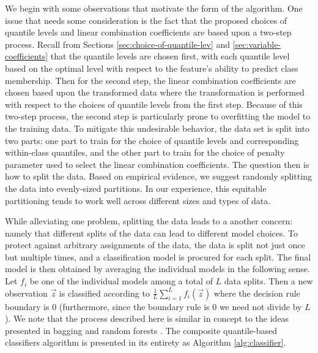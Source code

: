 We begin with some observations that motivate the form of the algorithm.  One
issue that needs some consideration is the fact that the proposed choices of
quantile levels and linear combination coefficients are based upon a two-step
process.  Recall from Sections \ref{sec:choice-of-quantile-lev} and
\ref{sec:variable-coefficients} that the quantile levels are chosen first, with
each quantile level based on the optimal level with respect to the feature's
ability to predict class membership.  Then for the second step, the linear
combination coefficients are chosen based upon the transformed data where the
transformation is performed with respect to the choices of quantile levels from
the first step.  Because of this two-step process, the second step is
particularly prone to overfitting the model to the training data.  To mitigate
this undesirable behavior, the data set is split into two parts: one part to
train for the choice of quantile levels and corresponding within-class
quantiles, and the other part to train for the choice of penalty parameter used
to select the linear combination coefficients.  The question then is how to
split the data.  Based on empirical evidence, we suggest randomly splitting the
data into evenly-sized partitions.  In our experience, this equitable
partitioning tends to work well across different sizes and types of data.

While alleviating one problem, splitting the data leads to a another concern:
namely that different splits of the data can lead to different model choices.
To protect against arbitrary assignments of the data, the data is split not just
once but multiple times, and a classification model is procured for each split.
The final model is then obtained by averaging the individual models in the
following sense.  Let $f_i$ be one of the individual models among a total of $L$
data splits.  Then a new observation $\vec{z}$ is classified according to
$\frac{1}{L} \sum_{i=1}^L f_i(\vec{z})$ where the decision rule boundary is 0
(furthermore, since the boundary rule is 0 we need not divide by $L$).  We note
that the process described here is similar in concept to the ideas presented in
bagging \cite{breiman1996} and random forests \cite{breiman2001}.  The composite
quantile-based classifiers algorithm is presented in its entirety as Algorithm
\ref{alg:classifier}.


